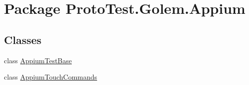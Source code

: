 \hypertarget{namespace_proto_test_1_1_golem_1_1_appium}{\section{Package Proto\-Test.\-Golem.\-Appium}
\label{namespace_proto_test_1_1_golem_1_1_appium}
}
\subsection*{Classes}
\begin{DoxyCompactItemize}
\item 
class \hyperlink{class_proto_test_1_1_golem_1_1_appium_1_1_appium_test_base}{Appium\-Test\-Base}
\item 
class \hyperlink{class_proto_test_1_1_golem_1_1_appium_1_1_appium_touch_commands}{Appium\-Touch\-Commands}
\end{DoxyCompactItemize}
